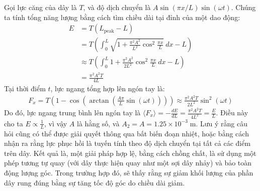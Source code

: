 \begin{solution}
Gọi lực căng của dây là $T$, và độ dịch chuyển là $A\sin(\pi x/L)\sin(\omega t)$. Chúng ta tính tổng năng lượng bằng cách tìm chiều dài tại đỉnh của một dao động:
\begin{align*}
  E&=T(L_{\text{peak}} - L)\\ 
  &=T\left(\int_0^L\sqrt{1 + \frac{\pi^2 A^2}{L^2}\cos^2\frac{\pi x}{L}}\ dx - L\right)\\ &\approx T\left(\int_0^L 1 + \frac{\pi^2 A^2}{2L^2}\cos^2\frac{\pi x}{L}\ dx - L\right)\\ 
  &= \frac{\pi^2 A^2 T}{4L}\end{align*}
Tại thời điểm $t$, lực ngang tổng hợp lên ngón tay là:
\begin{align*}
F_x = T\left(1 - \cos\left(\arctan\left(\frac{A\pi}{L}\sin(\omega t)\right)\right)\right)\approx \frac{\pi^2 A^2 T}{2L^2}\sin^2(\omega t)
\end{align*}
Do đó, lực ngang trung bình lên ngón tay là $\displaystyle \langle F_x\rangle = -\frac{dE}{dL} = \frac{\pi^2 A^2 T}{4L^2} = \frac{E}{L}$. Điều này cho ta $\displaystyle E \propto \frac{1}{L}$, vì vậy $A$ là hằng số, và $A_2=A=\boxed{1.25\times 10^{-3}\;\mathrm{m}}.$
\newline
\newline
Lưu ý rằng câu hỏi cũng có thể được giải quyết thông qua bất biến đoạn nhiệt, hoặc bằng cách nhận ra rằng lực phục hồi là tuyến tính theo độ dịch chuyển tại tất cả các điểm trên dây. Kết quả là, một giải pháp hợp lệ, bằng cách chồng chất, là sử dụng một phép tương tự quay (với dây thực hiện quay như một sợi dây nhảy) và bảo toàn động lượng góc. Trong trường hợp đó, sẽ thấy rằng sự giảm khối lượng của phần dây rung đúng bằng sự tăng tốc độ góc do chiều dài giảm.  

\end{solution}
